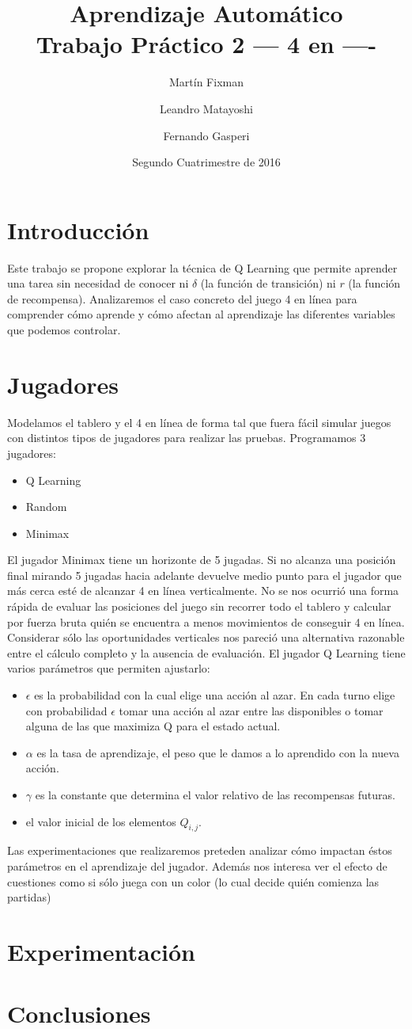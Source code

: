 \documentclass{article}
\title{Aprendizaje Automático \\ Trabajo Práctico 2 --- 4 en ----}
\author{Martín Fixman \and Leandro Matayoshi \and Fernando Gasperi}
\date{Segundo Cuatrimestre de 2016}
\begin{document}
\maketitle

\newpage

\section{Introducción}

Este trabajo se propone explorar la técnica de Q Learning que permite aprender una tarea
sin necesidad de conocer ni $\delta$ (la función de transición) ni $r$ (la función de recompensa).
Analizaremos el caso concreto del juego 4 en línea para comprender cómo aprende y cómo afectan
al aprendizaje las diferentes variables que podemos controlar.

\section{Jugadores}

Modelamos el tablero y el 4 en línea de forma tal que fuera fácil simular juegos con distintos tipos de jugadores para
realizar las pruebas. Programamos 3 jugadores:
\begin{itemize}
  \item Q Learning
  \item Random
  \item Minimax
\end{itemize}
El jugador Minimax tiene un horizonte de 5 jugadas. Si no alcanza una posición final mirando 5 jugadas
hacia adelante devuelve medio punto para el jugador que más cerca esté de alcanzar 4 en línea verticalmente.
No se nos ocurrió una forma rápida de evaluar las posiciones del juego sin recorrer todo el tablero y calcular
por fuerza bruta quién se encuentra a menos movimientos de conseguir 4 en línea. Considerar sólo las oportunidades
verticales nos pareció una alternativa razonable entre el cálculo completo y la ausencia de evaluación.
El jugador Q Learning tiene varios parámetros que permiten ajustarlo:
\begin{itemize}
  \item $\epsilon$ es la probabilidad con la cual elige una acción al azar. En
    cada turno elige con probabilidad $\epsilon$ tomar una acción al azar entre
    las disponibles o tomar alguna de las que maximiza Q para el estado actual.
  \item $\alpha$ es la tasa de aprendizaje, el peso que le damos a lo aprendido
    con la nueva acción.
  \item $\gamma$ es la constante que determina el valor relativo de las
    recompensas futuras.
  \item el valor inicial de los elementos $Q_{i, j}$.
\end{itemize}
Las experimentaciones que realizaremos preteden analizar cómo impactan éstos
parámetros en el aprendizaje del jugador. Además nos interesa ver el efecto de
cuestiones como si sólo juega con un color (lo cual decide quién comienza las
partidas) 

\section{Experimentación}

\section{Conclusiones}
\end{document}
